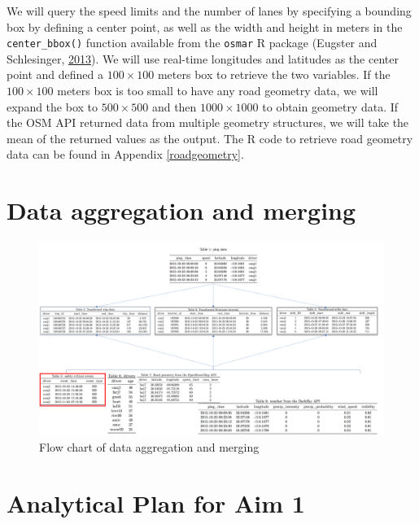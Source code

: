 \documentclass[12pt]{book}
\numberwithin{equation}{chapter}
\begin{document}
We will query the speed limits and the number of lanes by specifying a bounding box by defining a center point, as well as the width and height in meters in the \texttt{center\_bbox()} function available from the \texttt{osmar} R package (Eugster and Schlesinger, \protect\hyperlink{ref-eugster2013osmar}{2013}).
We will use real-time longitudes and latitudes as the center point and defined a \(100\times100\) meters box to retrieve the two variables.
If the \(100\times100\) meters box is too small to have any road geometry data, we will expand the box to \(500\times500\) and then \(1000\times1000\) to obtain geometry data.
If the OSM API returned data from multiple geometry structures, we will take the mean of the returned values as the output.
The R code to retrieve road geometry data can be found in Appendix \ref{roadgeometry}.

\hypertarget{data-aggregation-and-merging}{%
\section{Data aggregation and merging}\label{data-aggregation-and-merging}}

\begin{figure}[ht]

{\centering \includegraphics[width=\linewidth]{figs/Data_merging} 

}

\caption{Flow chart of data aggregation and merging}\label{fig:unnamed-chunk-1}
\end{figure}

\hypertarget{analytical-plan-for-aim-1}{%
\section{Analytical Plan for Aim 1}\label{analytical-plan-for-aim-1}}
\end{document}
